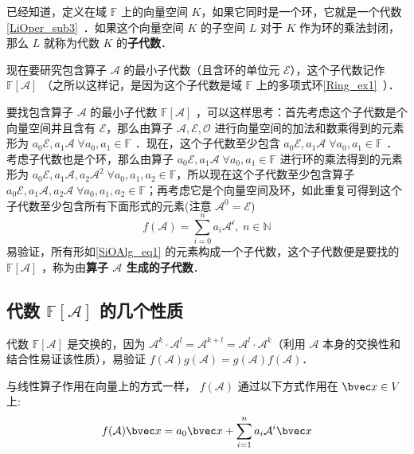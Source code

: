 
已经知道，定义在域 $\mathbb{F}$ 上的向量空间 $K$，如果它同时是一个环，它就是一个代数\autoref{LiOper_sub3}~．如果这个向量空间 $K$ 的子空间 $L$ 对于 $K$ 作为环的乘法封闭，那么 $L$ 就称为代数 $K$ 的\textbf{子代数}．

现在要研究包含算子 $\mathcal{A}$ 的最小子代数（且含环的单位元 $\mathcal{E}$），这个子代数记作 $\mathbb{F}[\mathcal A]$ （之所以这样记，是因为这个子代数是域 $\mathbb{F}$ 上的多项式环\autoref{Ring_ex1}~）．

要找包含算子 $\mathcal{A}$ 的最小子代数 $\mathbb{F}[\mathcal A]$ ，可以这样思考：首先考虑这个子代数是个向量空间并且含有 $\mathcal{E}$，那么由算子 $\mathcal{A,E,O}$ 进行向量空间的加法和数乘得到的元素形为 $a_0\mathcal{E},a_1\mathcal{A}\;\forall a_0,a_1\in\mathbb{F}$ ．现在，这个子代数至少包含 $a_0\mathcal{E},a_1\mathcal{A}\;\forall a_0,a_1\in\mathbb{F}$ ．考虑子代数也是个环，那么由算子 $a_0\mathcal{E},a_1\mathcal{A}\;\forall a_0,a_1\in\mathbb{F}$ 进行环的乘法得到的元素形为 $a_0\mathcal{E},a_1\mathcal{A},a_2\mathcal{A}^2\;\forall a_0,a_1,a_2\in\mathbb{F}$，所以现在这个子代数至少包含算子 $a_0\mathcal{E},a_1\mathcal{A},a_2\mathcal{A}\;\forall a_0,a_1,a_2\in\mathbb{F}$；再考虑它是个向量空间及环，如此重复可得到这个子代数至少包含所有下面形式的元素(注意 $\mathcal{A}^0=\mathcal{E}$)
\begin{equation}\label{SiOAlg_eq1}
f(\mathcal{A})=\sum_{i=0}^na_i\mathcal{A^i},\;n\in\mathbb{N}
\end{equation}
易验证，所有形如\autoref{SiOAlg_eq1} 的元素构成一个子代数，这个子代数便是要找的 $\mathbb{F}[\mathcal A]$ ，称为由\textbf{算子 $\mathcal{A}$ 生成的子代数}．
\subsection{代数 $\mathbb{F}[\mathcal{A}]$ 的几个性质}
代数 $\mathbb{F}[\mathcal A]$ 是交换的，因为 $\mathcal A^{k}\cdot \mathcal{A}^l=\mathcal{A}^{k+l}=\mathcal A^{l}\cdot \mathcal{A}^k$（利用 $\mathcal{A}$ 本身的交换性和结合性易证该性质），易验证 $f(\mathcal{A})g(\mathcal{A})=g(\mathcal{A})f(\mathcal{A})$．

与线性算子作用在向量上的方式一样， $f(\mathcal{A})$ 通过以下方式作用在 $\bvec x\in V$ 上:
\begin{equation}
f(\mathcal{A})\bvec x=a_0\bvec x+\sum_{i=1}^n a_i\mathcal{A}^i\bvec x
\end{equation}
